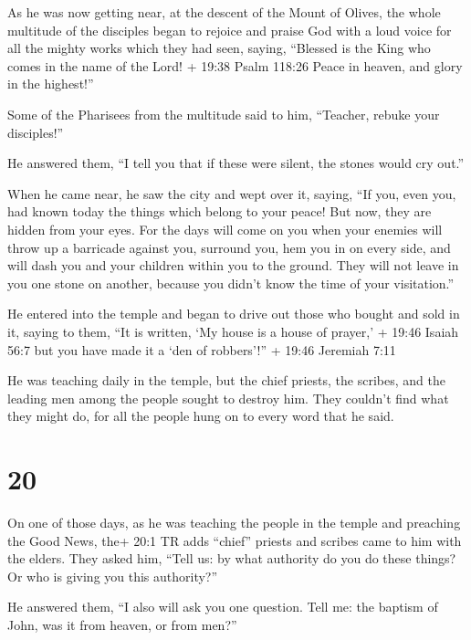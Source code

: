  As he was now getting near, at the descent of the Mount of
Olives, the whole multitude of the disciples began to rejoice and praise
God with a loud voice for all the mighty works which they had seen,
 saying, ``Blessed is the King who comes in the name of the
Lord! + 19:38 Psalm 118:26 Peace in heaven, and glory in the highest!''

 Some of the Pharisees from the multitude said to him,
``Teacher, rebuke your disciples!''

 He answered them, ``I tell you that if these were silent,
the stones would cry out.''

 When he came near, he saw the city and wept over it,
 saying, ``If you, even you, had known today the things
which belong to your peace! But now, they are hidden from your eyes.
 For the days will come on you when your enemies will throw
up a barricade against you, surround you, hem you in on every side,
 and will dash you and your children within you to the
ground. They will not leave in you one stone on another, because you
didn't know the time of your visitation.''

 He entered into the temple and began to drive out those
who bought and sold in it,  saying to them, ``It is
written, `My house is a house of prayer,' + 19:46 Isaiah 56:7 but you
have made it a `den of robbers'!'' + 19:46 Jeremiah 7:11

 He was teaching daily in the temple, but the chief
priests, the scribes, and the leading men among the people sought to
destroy him.  They couldn't find what they might do, for
all the people hung on to every word that he said.

\hypertarget{section-19}{%
\section{20}\label{section-19}}

 On one of those days, as he was teaching the people in the
temple and preaching the Good News, the+ 20:1 TR adds ``chief'' priests
and scribes came to him with the elders.  They asked him,
``Tell us: by what authority do you do these things? Or who is giving
you this authority?''

 He answered them, ``I also will ask you one question. Tell
me:  the baptism of John, was it from heaven, or from men?''


